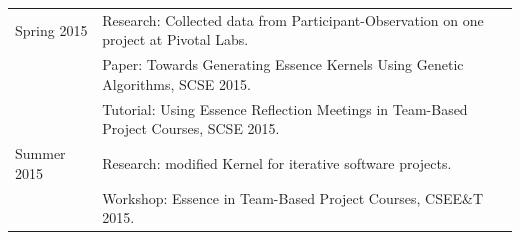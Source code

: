 \documentclass[preprint,12pt,3p]{elsarticle}
\begin{document}
\begin{table}[H]
\begin{tabular}{|p{1.00in}|p{5.00in}|}
Spring 2015 & Research: Collected data from Participant-Observation on one project at Pivotal Labs.\\ 
            & Paper: Towards Generating Essence Kernels Using Genetic Algorithms, SCSE 2015. \cite{SCSE2015} \\ 
            & Tutorial: Using Essence Reflection Meetings in Team-Based Project Courses, SCSE 2015.\cite{SCSE2015Tutorial} \\ \hline
Summer 2015 & Research: modified Kernel for iterative software projects.\\ 
            & Workshop: Essence in Team-Based Project Courses, CSEE\&T 2015. \cite{CSEET2015Workshop} \\ \hline                     
\end{tabular}
\end{table}




% 
% 
% 
% 
% 
% 
% 
% 
% 
% 
% 
% 


\end{document}
